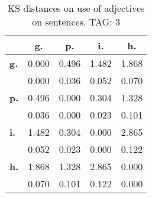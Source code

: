 \begin{table}[h!]
\begin{center}
\begin{tabular}{| l || c | c | c | c |}\hline
 & {\bf g.} & {\bf p.} & {\bf i.} & {\bf h.} \\\hline\hline
{\bf g.} & 0.000 & 0.496 & 1.482 & 1.868 \\
{\bf } & 0.000 & 0.036 & 0.052 & 0.070 \\\hline
{\bf p.} & 0.496 & 0.000 & 0.304 & 1.328 \\
{\bf } & 0.036 & 0.000 & 0.023 & 0.101 \\\hline
{\bf i.} & 1.482 & 0.304 & 0.000 & 2.865 \\
{\bf } & 0.052 & 0.023 & 0.000 & 0.122 \\\hline
{\bf h.} & 1.868 & 1.328 & 2.865 & 0.000 \\
{\bf } & 0.070 & 0.101 & 0.122 & 0.000 \\\hline
\end{tabular}
\caption{KS distances on use of adjectives on sentences. TAG: 3}
\end{center}
\end{table}